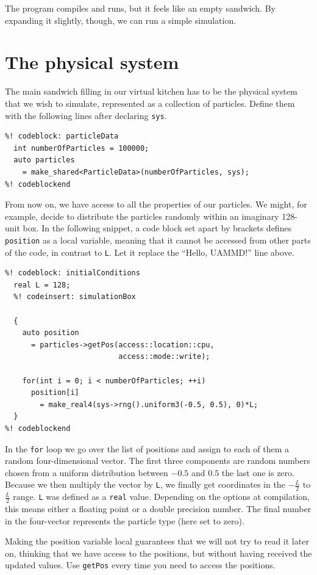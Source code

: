 The program compiles and runs, but it feels like an empty sandwich. By expanding
it slightly, though, we can run a simple simulation.

\section{\label{physical_system}The physical system}

The main sandwich filling in our virtual kitchen has to be the physical system
that we wish to simulate, represented as a collection of particles. Define them
with the following lines after declaring \texttt{sys}.
\begin{lstlisting}
%! codeblock: particleData
  int numberOfParticles = 100000;
  auto particles
    = make_shared<ParticleData>(numberOfParticles, sys);
%! codeblockend
\end{lstlisting}
From now on, we have access to all the properties of our particles. We might, 
for example, decide to distribute the particles randomly within an imaginary 
128-unit box. In the following snippet, a code block set apart by brackets
defines \texttt{position} as a local variable, meaning that it cannot be
accessed from  other parts of the code, in contrast to \texttt{L}. Let it
replace the ``Hello, UAMMD!'' line above.\label{initialConditions}
\begin{lstlisting}
%! codeblock: initialConditions
  real L = 128;
  %! codeinsert: simulationBox

  {
    auto position
      = particles->getPos(access::location::cpu,
                          access::mode::write);

    for(int i = 0; i < numberOfParticles; ++i)
      position[i]
        = make_real4(sys->rng().uniform3(-0.5, 0.5), 0)*L;
  }
%! codeblockend
\end{lstlisting}
In the \texttt{for} loop we go over the list of positions and assign to each of
them a random four-dimensional vector. The first three components are random
numbers chosen from a uniform distribution between $-0.5$ and $0.5$ the last one
is zero. Because we then multiply the vector by \texttt{L}, we finally get
coordinates in the $-\frac{L}{2}$ to $\frac{L}{2}$ range. \texttt{L} was defined
as a \texttt{real} value. Depending on the options at compilation, this means
either a floating point or a double precision number. The final number in the
four-vector represents the particle type (here set to zero).

Making the position variable local guarantees that we will not try to read it
later on, thinking that we have access to the positions, but without having
received the updated values. Use \texttt{getPos} every time you need to access
the positions.

